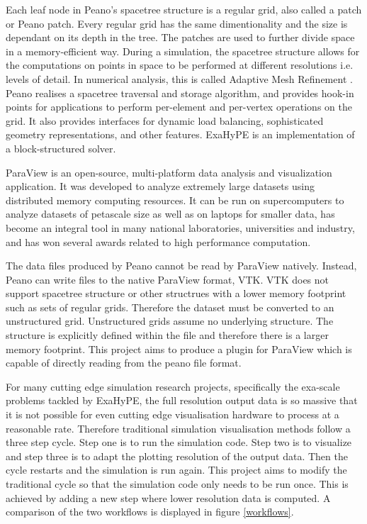 \documentclass[12pt,a4paper]{article}
\begin{document}
Each leaf node in Peano's spacetree structure is a regular grid, also called a patch or Peano patch. Every regular grid has the same dimentionality and the size is dependant on its depth in the tree. The patches are used to further divide space in a memory-efficient way.
During a simulation, the spacetree structure allows for the computations on points in space to be performed at different resolutions i.e. levels of detail. In numerical analysis, this is called Adaptive Mesh Refinement \cite{DUBEY20143217}.
Peano realises a spacetree traversal and storage algorithm, and provides hook-in points for applications to perform per-element and per-vertex operations on the grid. It also provides interfaces for dynamic load balancing, sophisticated geometry representations, and other features. ExaHyPE is an implementation of a block-structured solver.


ParaView \cite{Paraview} is an open-source, multi-platform data analysis and visualization application. It was developed to analyze extremely large datasets using distributed memory computing resources. It can be run on supercomputers to analyze datasets of petascale size as well as on laptops for smaller data, has become an integral tool in many national laboratories, universities and industry, and has won several awards related to high performance computation.

The data files produced by Peano cannot be read by ParaView natively. Instead, Peano can write files to the native ParaView format, VTK. VTK does not support spacetree structure or other structrues with a lower memory footprint such as sets of regular grids. Therefore the dataset must be converted to an unstructured grid. Unstructured grids assume no underlying structure. The structure is explicitly defined within the file and therefore there is a larger memory footprint. This project aims to produce a plugin for ParaView which is capable of directly reading from the peano file format.

For many cutting edge simulation research projects, specifically the exa-scale problems tackled by ExaHyPE, the full resolution output data is so massive that it is not possible for even cutting edge visualisation hardware to process at a reasonable rate. Therefore traditional simulation visualisation methods follow a three step cycle. Step one is to run the simulation code. Step two is to visualize and step three is to adapt the plotting resolution of the output data. Then the cycle restarts and the simulation is run again. This project aims to modify the traditional cycle so that the simulation code only needs to be run once. This is achieved by adding a new step where lower resolution data is computed. A comparison of the two workflows is displayed in figure \ref{workflows}.
\end{document}
